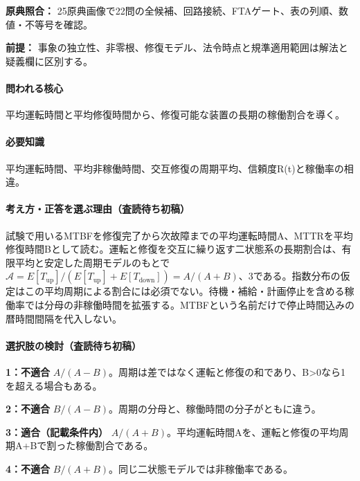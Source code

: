 \noindent\textbf{原典照合：} 25原典画像で22問の全候補、回路接続、FTAゲート、表の列順、数値・不等号を確認。\par

\noindent\textbf{前提：} 事象の独立性、非零根、修復モデル、法令時点と規準適用範囲は解法と疑義欄に区別する。\par

\paragraph{問われる核心} 平均運転時間と平均修復時間から、修復可能な装置の長期の稼働割合を導く。

\paragraph{必要知識} 平均運転時間、平均非稼働時間、交互修復の周期平均、信頼度R(t)と稼働率の相違。

\paragraph{考え方・正答を選ぶ理由（査読待ち初稿）} 試験で用いるMTBFを修復完了から次故障までの平均運転時間A、MTTRを平均修復時間Bとして読む。運転と修復を交互に繰り返す二状態系の長期割合は、有限平均と安定した周期モデルのもとで \(\mathcal A=E[T_{\mathrm{up}}]/(E[T_{\mathrm{up}}]+E[T_{\mathrm{down}}])=A/(A+B)\)、3である。指数分布の仮定はこの平均周期による割合には必須でない。待機・補給・計画停止を含める稼働率では分母の非稼働時間を拡張する。MTBFという名前だけで停止時間込みの暦時間間隔を代入しない。

\paragraph{選択肢の検討（査読待ち初稿）}\mbox{}\par

\noindent\textbf{1：不適合} \(A/(A-B)\)。周期は差ではなく運転と修復の和であり、B>0なら1を超える場合もある。\par

\noindent\textbf{2：不適合} \(B/(A-B)\)。周期の分母と、稼働時間の分子がともに違う。\par

\noindent\textbf{3：適合（記載条件内）} \(A/(A+B)\)。平均運転時間Aを、運転と修復の平均周期A+Bで割った稼働割合である。\par

\noindent\textbf{4：不適合} \(B/(A+B)\)。同じ二状態モデルでは非稼働率である。\par

